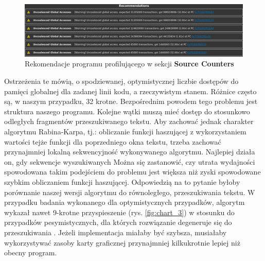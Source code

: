 \begin{figure}[H]
    \centering
    \includegraphics[width=\linewidth]{images/Warnings.png}
    \caption{Rekomendacje programu profilującego w sekcji \textbf{Source Counters}}
    \label{fig:warnings}
\end{figure}

Ostrzeżenia te mówią, o spodziewanej, optymistycznej liczbie dostępów do pamięci globalnej dla zadanej linii kodu, a rzeczywistym stanem. Różnice często są, w naszym przypadku, 32 krotne. Bezpośrednim powodem tego problemu jest struktura naszego programu. Kolejne wątki muszą mieć dostęp do stosunkowo odległych fragmentów przeszukiwanego tekstu. Aby zachować jednak charakter algorytmu Rabina-Karpa, tj.: obliczanie funkcji haszującej z wykorzystaniem wartości tejże funkcji dla poprzedniego okna tekstu, trzeba zachować przynajmniej lokalną sekwencyjność wykonywanego algorytmu. Najlepiej działa on, gdy sekwencje wyszukiwanych  Można się zastanowić, czy utrata wydajności spowodowana takim podejściem do problemu jest większa niż zyski spowodowane szybkim obliczaniem funkcji haszującej. Odpowiedzią na to pytanie byłoby porównanie naszej wersji algorytmu do równoległego,  przeszukiwania tekstu. W przypadku badania wykonanego dla optymistycznych przypadków, algorytm wykazał nawet 9-krotne przyspieszenie (rys. \ref{fig:chart_3}) w stosunku do przypadków pesymistycznych, dla których rozwiązanie degeneruje się do przeszukiwania . Jeżeli implementacja  miałaby być szybsza, musiałaby wykorzystywać zasoby karty graficznej przynajmniej kilkukrotnie lepiej niż obecny program.

